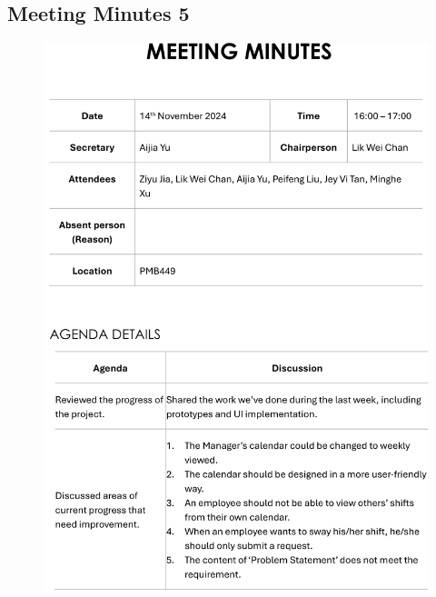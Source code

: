 \documentclass[a4paper,12pt, oneside]{report}
\begin{document}
\begin{appendices}
\section{Meeting Minutes 5}
\begin{figure}[H]
    \centering
    \includegraphics[width=\textwidth]{Minutes/Minutes_5-cropped-1.png}
\end{figure}
\newpage
\begin{figure}[H]
    \centering

\end{figure}
\end{appendices}
\end{document}
